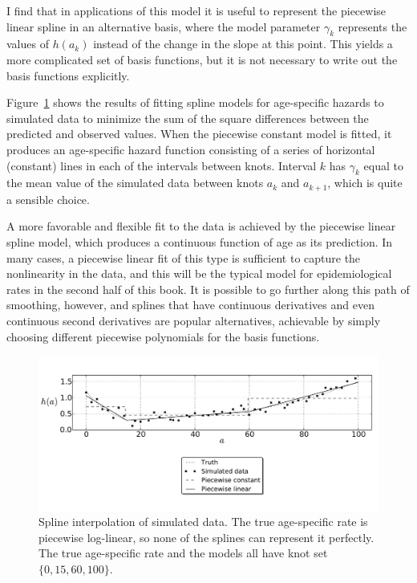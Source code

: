 I find that in applications of this model it is useful to represent
the piecewise linear spline in an alternative basis, where the model
parameter $\gamma_k$ represents the values of $h(a_k)$ instead of the
change in the slope at this point.  This yields a more complicated set
of basis functions, but it is not necessary to write out the basis
functions explicitly.


Figure~\ref{splines_fig} shows the results of fitting spline models
for age-specific hazards to simulated data to minimize the sum of the
square differences between the predicted and observed values.  When
the piecewise constant model is fitted, it produces an age-specific
hazard function consisting of a series of horizontal (constant) lines
in each of the intervals between knots.  Interval $k$ has
$\gamma_k$ equal to the mean value of the simulated data between knots
$a_k$ and $a_{k+1}$, which is quite a sensible choice.

A more favorable and flexible fit to the data is achieved by the
piecewise linear spline model, which produces a continuous function
of age as its prediction. In many cases, a piecewise linear fit of
this type is sufficient to capture the nonlinearity in the data, and
this will be the typical model for epidemiological rates in the second
half of this book.  It is possible to go further along this path of
smoothing, however, and splines that have continuous derivatives and
even continuous second derivatives are popular alternatives, achievable
by simply choosing different piecewise polynomials for the basis
functions.


\begin{figure}[h]
\begin{center}
\includegraphics[width=\textwidth]{splines-fig.pdf}
\caption{Spline interpolation of simulated data. The true age-specific
  rate is piecewise log-linear, so none of the splines can represent
  it perfectly. The true age-specific rate and the models all have
  knot set $\{0, 15, 60, 100\}$.}
\label{splines_fig}
\end{center}
\end{figure}


